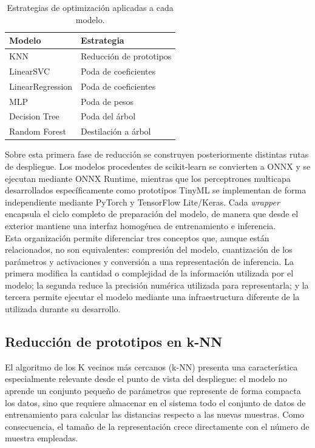 \documentclass[a4paper,12pt,twoside,final]{book}
\begin{document}
\begin{table}[htbp]
  \centering
  \begin{tabular}{ll}
    \hline
    \textbf{Modelo} & \textbf{Estrategia} \\
    \hline
    KNN              & Reducción de prototipos \\
    LinearSVC        & Poda de coeficientes \\
    LinearRegression & Poda de coeficientes \\
    MLP              & Poda de pesos \\
    Decision Tree    & Poda del árbol \\
    Random Forest    & Destilación a árbol \\
    \hline
  \end{tabular}
  \caption{Estrategias de optimización aplicadas a cada modelo.}
  \label{tab:estrategias_optimizacion}
\end{table}

Sobre esta primera fase de reducción se construyen posteriormente distintas rutas de despliegue. Los modelos
procedentes de scikit-learn se convierten a ONNX y se ejecutan mediante ONNX Runtime, mientras que los perceptrones
multicapa desarrollados específicamente como prototipos TinyML se implementan de forma independiente mediante PyTorch y
TensorFlow Lite/Keras. Cada \textit{wrapper} encapsula el ciclo completo de preparación del modelo, de manera que desde
el exterior mantiene una interfaz homogénea de entrenamiento e inferencia.\\

Esta organización permite diferenciar tres conceptos que, aunque están relacionados, no son equivalentes: compresión
del modelo, cuantización de los parámetros y activaciones y conversión a una representación de inferencia. La primera
modifica la cantidad o complejidad de la información utilizada por el modelo; la segunda reduce la precisión numérica
utilizada para representarla; y la tercera permite ejecutar el modelo mediante una infraestructura diferente de la
utilizada durante su desarrollo.

\subsection{Reducción de prototipos en k-NN}
El algoritmo de los K vecinos más cercanos (k-NN) presenta una característica especialmente relevante desde el punto de
vista del despliegue: el modelo no aprende un conjunto pequeño de parámetros que represente de forma compacta los
datos, sino que requiere almacenar en el sistema todo el conjunto de datos de entrenamiento para calcular las
distancias respecto a las nuevas muestras. Como consecuencia, el tamaño de la representación crece directamente con el
número de muestra empleadas.\\
\end{document}
